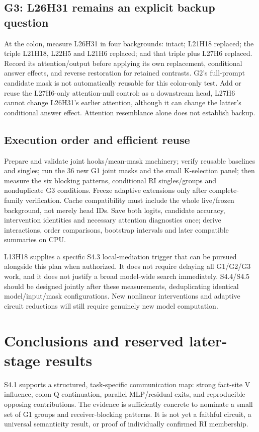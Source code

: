 \documentclass[11pt,a4paper]{article}
\begin{document}
\subsection{G3: L26H31 remains an explicit backup question}
At the colon, measure L26H31 in four backgrounds: intact; L21H18 replaced; the triple L21H18, L22H5 and L21H6 replaced; and that triple plus L27H6 replaced. Record its attention/output before applying its own replacement, conditional answer effects, and reverse restoration for retained contrasts. G2's full-prompt candidate mask is not automatically reusable for this colon-only test. Add or reuse the L27H6-only attention-null control: as a downstream head, L27H6 cannot change L26H31's earlier attention, although it can change the latter's conditional answer effect. Attention resemblance alone does not establish backup.

\subsection{Execution order and efficient reuse}
Prepare and validate joint hooks/mean-mask machinery; verify reusable baselines and singles; run the 36 new G1 joint masks and the small K-selection panel; then measure the six blocking patterns, conditional RI singles/groups and nonduplicate G3 conditions. Freeze adaptive extensions only after complete-family verification. Cache compatibility must include the whole live/frozen background, not merely head IDs. Save both logits, candidate accuracy, intervention identities and necessary attention diagnostics once; derive interactions, order comparisons, bootstrap intervals and later compatible summaries on CPU.

L13H18 supplies a specific S4.3 local-mediation trigger that can be pursued alongside this plan when authorized. It does not require delaying all G1/G2/G3 work, and it does not justify a broad model-wide search immediately. S4.4/S4.5 should be designed jointly after these measurements, deduplicating identical model/input/mask configurations. New nonlinear interventions and adaptive circuit reductions will still require genuinely new model computation.
\FloatBarrier

\section{Conclusions and reserved later-stage results}
S4.1 supports a structured, task-specific communication map: strong fact-site V influence, colon Q continuation, parallel MLP/residual exits, and reproducible opposing contributions. The evidence is sufficiently concrete to nominate a small set of G1 groups and receiver-blocking patterns. It is not yet a faithful circuit, a universal semanticity result, or proof of individually confirmed RI membership.
\end{document}

